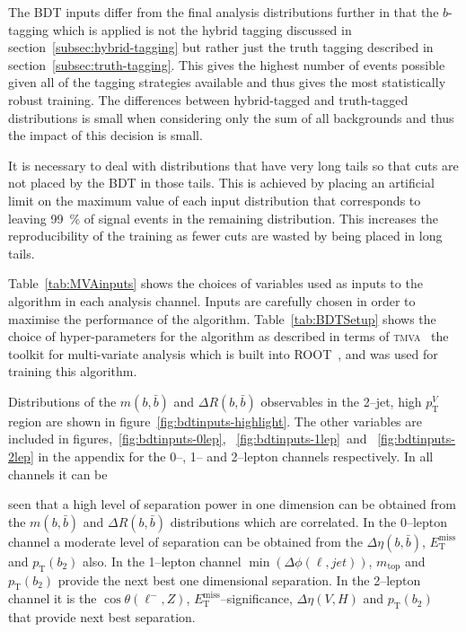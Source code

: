 The BDT inputs differ from the final analysis distributions further in that the
$b$-tagging which is applied is not the hybrid tagging discussed in
section~\ref{subsec:hybrid-tagging} but rather just the truth tagging described
in section~\ref{subsec:truth-tagging}. This gives the highest number of events
possible given all of the tagging strategies available and thus gives the most
statistically robust training. The differences between hybrid-tagged and
truth-tagged distributions is small when considering only the sum of all
backgrounds and thus the impact of this decision is small.

It is necessary to deal with distributions that have very long tails so that
cuts are not placed by the BDT in those tails. This is achieved by placing an
artificial limit on the maximum value of each input distribution that
corresponds to leaving 99~\% of signal events in the remaining distribution.
This increases the reproducibility of the training as fewer cuts are wasted by
being placed in long tails.

Table~\ref{tab:MVAinputs} shows the choices of variables used as inputs to the
algorithm in each analysis channel. Inputs are carefully chosen in order to
maximise the performance of the algorithm.
 Table~\ref{tab:BDTSetup} shows the
choice of hyper-parameters for the algorithm as described in terms of
\textsc{tmva}~\cite{TMVA} the toolkit for multi-variate analysis which is built
into \textsc{ROOT}~\cite{ROOT}, and was used for training this algorithm.


Distributions of the $m(b,\bar{b})$ and $\Delta R (b, \bar{b})$ observables in
the 2--jet, high $p_{\mathrm{T}}^V$ region are shown in
figure~\ref{fig:bdtinputs-highlight}. The other variables are included in
figures,~\ref{fig:bdtinputs-0lep}, ~\ref{fig:bdtinputs-1lep}~and
~\ref{fig:bdtinputs-2lep} in the appendix for the 0--, 1-- and 2--lepton
channels respectively. In all channels it can be

seen that a high level of separation power in one dimension can be obtained from
the $m(b,\bar{b})$ and $\Delta R (b, \bar{b})$ distributions which are
correlated. In the 0--lepton channel a moderate level of separation can be
obtained from the $\Delta \eta(b, \bar{b})$, $E_{\mathrm{T}}^{\text{miss}}$ and
$p_{\mathrm{T}}(b_2)$ also. In the 1--lepton channel
$\min(\Delta\phi(\ell,jet))$, $m_{\text{top}}$ and $p_{\mathrm{T}}(b_2)$ provide
the next best one dimensional separation. In the 2--lepton channel it is the
$\cos{\theta(\ell^-,Z)}$, $E_{\mathrm{T}}^{\text{miss}}$--significance, $\Delta
\eta(V, H)$ and $p_{\mathrm{T}}(b_2)$ that provide next best separation.


